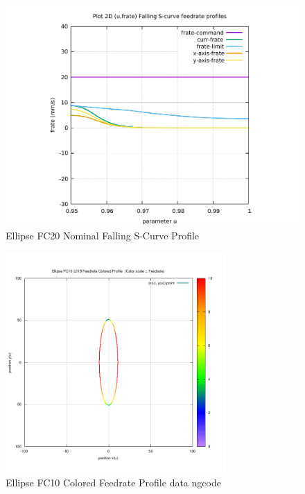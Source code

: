 \begin{figure}
	\caption     {Ellipse FC20 Nominal Falling S-Curve Profile}
	\label{16-img-Ellipse-FC20-Nominal-Falling-S-Curve-Profile.pdf}
	\includegraphics[width=1.00\textwidth]{Chap4/appendix/app-Ellipse/plots/16-img-Ellipse-FC20-Nominal-Falling-S-Curve-Profile.pdf}
\end{figure}

\clearpage
\pagebreak

\begin{figure}
	\caption     {Ellipse FC10 Colored Feedrate Profile data ngcode}
	\label{17-img-Ellipse-FC10-Colored-Feedrate-Profile-data_ngcode.png}
	\includegraphics[width=0.75\textwidth]{Chap4/appendix/app-Ellipse/plots/17-img-Ellipse-FC10-Colored-Feedrate-Profile-data_ngcode.png}
\end{figure}


